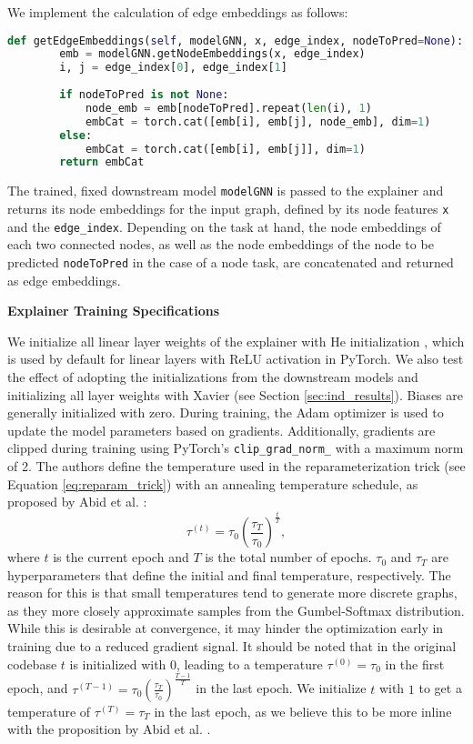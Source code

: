 We implement the calculation of edge embeddings as follows:
\begin{lstlisting}[language=Python, caption=Implementation of edge embedding calculation, label=lst:edge_embedding_calc]
    def getEdgeEmbeddings(self, modelGNN, x, edge_index, nodeToPred=None):
        emb = modelGNN.getNodeEmbeddings(x, edge_index)
        i, j = edge_index[0], edge_index[1]
        
        if nodeToPred is not None:
            node_emb = emb[nodeToPred].repeat(len(i), 1)
            embCat = torch.cat([emb[i], emb[j], node_emb], dim=1)
        else:
            embCat = torch.cat([emb[i], emb[j]], dim=1)
        return embCat
\end{lstlisting}
The trained, fixed downstream model \lstinline|modelGNN| is passed to the explainer and returns its node embeddings for the input graph, defined by its node features \lstinline|x| and the \lstinline|edge_index|. Depending on the task at hand, the node embeddings of each two connected nodes, as well as the node embeddings of the node to be predicted \lstinline|nodeToPred| in the case of a node task, are concatenated and returned as edge embeddings. \bigskip

\textbf{Explainer Training Specifications}\par
We initialize all linear layer weights of the explainer with He initialization \cite{he2015delving}, which is used by default for linear layers with ReLU activation in PyTorch. We also test the effect of adopting the initializations from the downstream models and initializing all layer weights with Xavier \cite{glorot2010understanding} (see Section \ref{sec:ind_results}). Biases are generally initialized with zero. During training, the Adam \cite{kingma2014adam} optimizer is used to update the model parameters based on gradients. Additionally, gradients are clipped during training using PyTorch's \lstinline|clip_grad_norm_| with a maximum norm of 2. The authors define the temperature used in the reparameterization trick (see Equation \ref{eq:reparam_trick}) with an annealing temperature schedule, as proposed by Abid et al. \cite{abid2019concrete}:
\begin{equation}
    \tau^{(t)} = \tau_0(\frac{\tau_T}{\tau_0})^{\frac{t}{T}},
\end{equation} 
where $t$ is the current epoch and $T$ is the total number of epochs. $\tau_0$ and $\tau_T$ are hyperparameters that define the initial and final temperature, respectively.
The reason for this is that small temperatures tend to generate more discrete graphs, as they more closely approximate samples from the Gumbel-Softmax distribution. While this is desirable at convergence, it may hinder the optimization early in training due to a reduced gradient signal. It should be noted that in the original codebase $t$ is initialized with $0$, leading to a temperature $\tau^{(0)} = \tau_0$ in the first epoch, and $\tau^{(T-1)} = \tau_0(\frac{\tau_T}{\tau_0})^{\frac{T-1}{T}}$ in the last epoch. We initialize $t$ with $1$ to get a temperature of $\tau^{(T)} = \tau_T$ in the last epoch, as we believe this to be more inline with the proposition by Abid et al. \cite{abid2019concrete}. \bigskip

